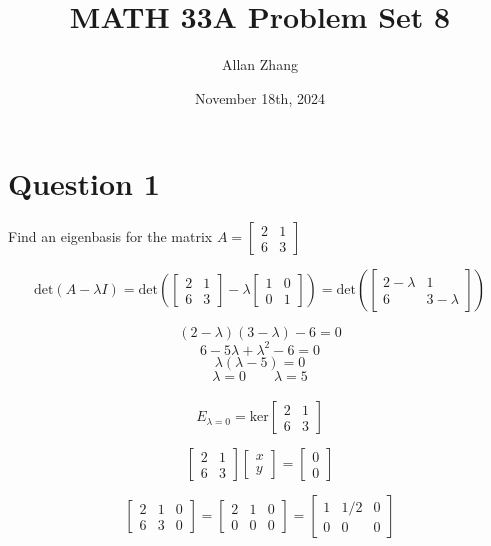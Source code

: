 \documentclass[hidelinks]{article}
\title{\textbf{MATH 33A Problem Set 8}}
\author{Allan Zhang}
\date{November 18th, 2024}
\begin{document}
\hypersetup{bookmarksnumbered=true,}
\pagecolor{white}
\color{black}
\maketitle

\section{Question 1}
Find an eigenbasis for the matrix $A = \begin{bmatrix} 2 & 1 \\ 6 & 3 \end{bmatrix}$ 

\[
\text{det}(A - \lambda I) = \text{det}(\begin{bmatrix} 2 & 1 \\ 6 & 3 \end{bmatrix} - \lambda \begin{bmatrix} 1 & 0 \\ 0 & 1 \end{bmatrix}) = \text{det} (\begin{bmatrix} 2 - \lambda & 1 \\ 6 & 3 - \lambda \end{bmatrix})
\]

\[
(2 - \lambda)(3 - \lambda) - 6 = 0 
\]
\[
6 - 5\lambda + \lambda^2 - 6 = 0
\]
\[
\lambda(\lambda - 5) = 0
\] 
\[
\lambda = 0 \quad \quad \lambda = 5
\]
\\
\[
E_{\lambda = 0} = \text{ker}\begin{bmatrix} 2 & 1 \\ 6 & 3 \end{bmatrix} 
\]

\[
\begin{bmatrix} 2 & 1 \\ 6 & 3 \end{bmatrix} \begin{bmatrix} x \\ y \end{bmatrix} = \begin{bmatrix} 0 \\ 0 \end{bmatrix}
\]

\[
\begin{bmatrix}2 & 1 & 0\\ 6 & 3 & 0\end{bmatrix} = \begin{bmatrix}2 & 1 & 0\\ 0 & 0 & 0\end{bmatrix} = \begin{bmatrix}1 & 1/2 & 0\\ 0 & 0 & 0\end{bmatrix}
\]
\end{document}
